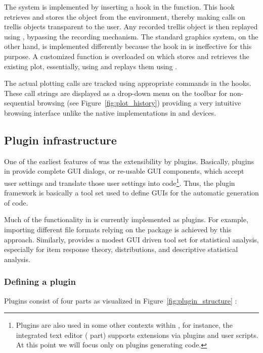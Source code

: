 The  system is implemented by inserting a hook in the 
function. This hook retrieves and stores the  object from the
 environment, thereby making  calls on trellis
objects transparent to the user. Any recorded trellis object is then replayed
using , bypassing the recording mechanism. The standard graphics
system, on the other hand, is implemented differently because the hook in
 is ineffective for this purpose. A customized function is overloaded
on  which stores and retrieves the existing plot, essentially, using
 and replays them using .

The actual plotting calls are tracked using appropriate  commands in
the hooks. These call strings are displayed as a drop-down menu on the toolbar
for non-sequential browsing (see Figure~\ref{fig:plot_history}) providing a very intuitive browsing
interface unlike the native implementations in  and  devices.

\subsection{Plugin infrastructure}
\label{sec:technical_plugins}
One of the earliest features of  was the extensibility by plugins.
Basically, plugins in  provide complete GUI dialogs, or re-usable
GUI components, which accept user settings and translate those user settings
into  code\footnote{
    Plugins are also used in some other contexts within , for instance, the
    integrated text editor ( part) supports extensions via plugins and user scripts. At this point we
    will focus only on plugins generating  code.
}. Thus, the plugin framework is basically a tool set used to define
GUIs for the automatic generation of  code.

Much of the functionality in  is currently implemented as plugins. For example, importing different file
formats relying on the  package is achieved by this approach. Similarly,
 provides a modest GUI driven tool set for statistical analysis,
especially for item response theory, distributions, and descriptive
statistical analysis.

\subsubsection{Defining a plugin}
\label{sec:technical_plugins_defining}
Plugins consist of four parts as visualized in Figure~\ref{fig:plugin_structure} 
\citep[see Section~\ref{sec:example_plugin} for an example; for a complete
manual, see][]{Friedrichsmeier2010}:

